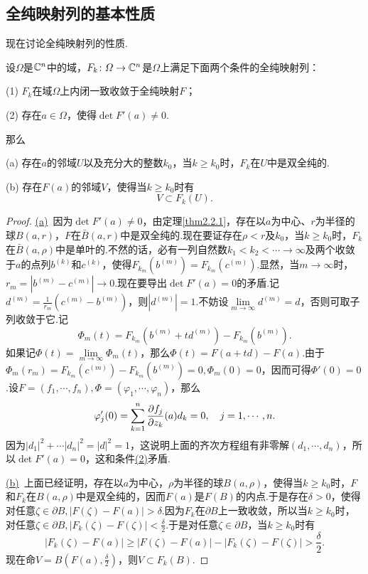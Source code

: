 \subsection{全纯映射列的基本性质}
现在讨论全纯映射列的性质.
\begin{theorem}\label{thm2.2.6}
	设$\Omega$是$\mathbb C^n$中的域，$F_k\colon \varOmega\to\mathbb C^n$是$\Omega$上满足下面两个条件的全纯映射列：
	
	(1)\hypertarget{2.2.6}{}
	$F_k$在域$\Omega$上内闭一致收敛于全纯映射$F$；
	
	(2)\hypertarget{2.2.6}{}
	存在$a\in\Omega$，使得$\det F'(a)\neq0$.
	
	那么
	
	(a)\hypertarget{2.2.6.1}{}
	存在$a$的邻域$U$以及充分大的整数$k_0$，当$k\ge k_0$时，$F_k$在$U$中是双全纯的.
	
	(b)\hypertarget{2.2.6.1}{}
	存在$F(a)$的邻域$V$，使得当$k\ge k_0$时有
	\[V\subset F_k(U).\]	
\end{theorem}
\begin{proof}
	\hyperlink{2.2.6.1}{(a)}\, 因为$\det F'(a)\neq0$，由定理\ref{thm2.2.1}，存在以$a$为中心、$r$为半径的球$B(a,r)$，$F$在$\bar{B}(a,r)$中是双全纯的.现在要证存在$\rho<r$及$k_0$，当$k\ge k_0$时，$F_k$在$\bar{B}(a,\rho)$中是单叶的.不然的话，必有一列自然数$k_1<k_2<\cdots\to\infty$及两个收敛于$a$的点列$b^{(k)}$和$c^{(k)}$，使得$F_{k_m}(b^{(m)})=F_{k_m}(c^{(m)})$.显然，当$m\to\infty$时，$r_m=|b^{(m)}-c^{(m)}|\to0$.现在要导出$\det F'(a)=0$的矛盾.记$d^{(m)}=\frac1{r_m}(c^{(m)}-b^{(m)})$，则$|d^{(m)}|=1$.不妨设$\lim\limits_{m\to\infty} d^{(m)}=d$，否则可取子列收敛于它.记
	\[\Phi_m(t)=F_{k_m}(b^{(m)}+td^{(m)})-F_{k_m}(b^{(m)}).\]
	如果记$\Phi(t)=\lim\limits_{m\to\infty}\Phi_m(t)$，那么$\Phi(t)=F(a+td)-F(a)$.由于$\Phi_m(r_m)=F_{k_m}(c^{(m)})-F_{k_m}(b^{(m)})=0,\Phi_m(0)=0$，因而可得$\Phi'(0)=0$.设$F=(f_1,\cdots,f_n),\Phi=(\varphi_1,\cdots,\varphi_n)$，那么
	\[\varphi_j'(0)=\sum_{k=1}^{n}\frac{\partial f_j}{\partial z_k}(a)d_k=0,\quad j=1,\cdots,n.\]
	因为\quad $|d_1|^2+\cdots|d_n|^2=|d|^2=1$，这说明上面的齐次方程组有非零解$(d_1,\cdots,d_n)$，所以$\det F'(a)=0$，这和条件\hyperlink{2.2.6}{(2)}矛盾.
	
	\hyperlink{2.2.6.1}{(b)}\, 上面已经证明，存在以$a$为中心，$\rho$为半径的球$B(a,\rho)$，使得当$k\ge k_0$时，$F$和$F_k$在$B(a,\rho)$中是双全纯的，因而$F(a)$是$F(B)$的内点.于是存在$\delta>0$，使得对任意$\zeta\in\partial B,|F(\zeta)-F(a)|>\delta$.因为$F_k$在$\partial B$上一致收敛，所以当$k\ge k_0$时，对任意$\zeta\in\partial B,|F_k(\zeta)-F(\zeta)|<\frac{\delta}{2}$.于是对任意$\zeta\in\partial B$，当$k\ge k_0$时有
	\[	|F_k(\zeta)-F(a)|
		\ge|F(\zeta)-F(a)|-|F_k(\zeta)-F(\zeta)|>\frac{\delta}{2}.
	\]
现在命$V=B\left(F(a),\frac{\delta}{2}\right)$，则$V\subset F_k(B)$.
\end{proof}
